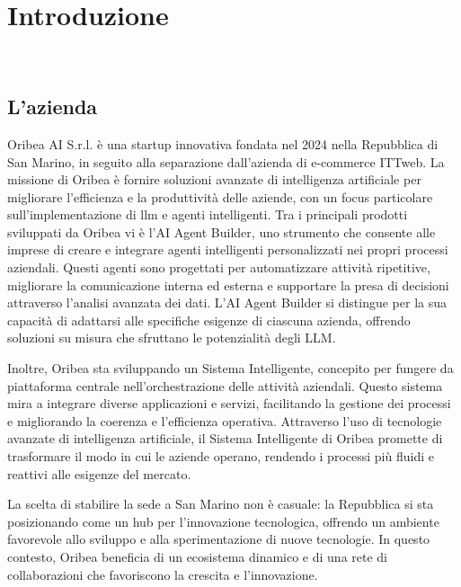 \chapter{Introduzione}
\label{cap:introduzione}

\\

\section{L'azienda}

Oribea AI S.r.l. è una startup innovativa fondata nel 2024 nella Repubblica di San Marino, in seguito alla separazione dall'azienda di e-commerce ITTweb. La missione di Oribea è fornire soluzioni avanzate di intelligenza artificiale per migliorare l'efficienza e la produttività delle aziende, con un focus particolare sull'implementazione di \gls{llm} e agenti intelligenti.
Tra i principali prodotti sviluppati da Oribea vi è l'AI Agent Builder, uno strumento che consente alle imprese di creare e integrare agenti intelligenti personalizzati nei propri processi aziendali. Questi agenti sono progettati per automatizzare attività ripetitive, migliorare la comunicazione interna ed esterna e supportare la presa di decisioni attraverso l'analisi avanzata dei dati. L'AI Agent Builder si distingue per la sua capacità di adattarsi alle specifiche esigenze di ciascuna azienda, offrendo soluzioni su misura che sfruttano le potenzialità degli LLM.

Inoltre, Oribea sta sviluppando un Sistema Intelligente, concepito per fungere da piattaforma centrale nell'orchestrazione delle attività aziendali. Questo sistema mira a integrare diverse applicazioni e servizi, facilitando la gestione dei processi e migliorando la coerenza e l'efficienza operativa. Attraverso l'uso di tecnologie avanzate di intelligenza artificiale, il Sistema Intelligente di Oribea promette di trasformare il modo in cui le aziende operano, rendendo i processi più fluidi e reattivi alle esigenze del mercato.

La scelta di stabilire la sede a San Marino non è casuale: la Repubblica si sta posizionando come un hub per l'innovazione tecnologica, offrendo un ambiente favorevole allo sviluppo e alla sperimentazione di nuove tecnologie. In questo contesto, Oribea beneficia di un ecosistema dinamico e di una rete di collaborazioni che favoriscono la crescita e l'innovazione.

